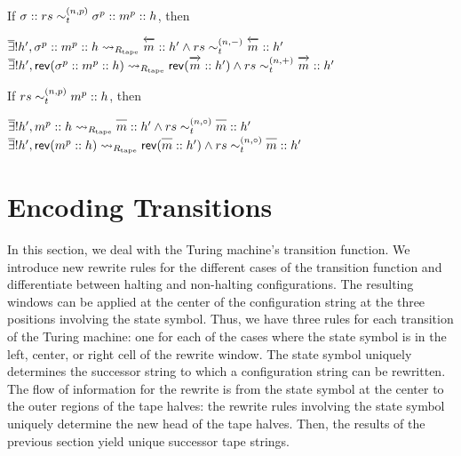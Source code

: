 \begin{lemma}\label{lem:tape_rem}
  If $\sigma :: rs \sim_t^{(n, p)} \sigma^p :: m^p :: h$, then 
  \begin{enumerate}
     $\mexists h', \sigma^p :: m^p :: h \strent{\Rtape} \polneg{m} :: h' \land rs \reprtt{n}{-} \polneg{m} :: h'$
     $\mexists h', \rev{(\sigma^p :: m^p :: h)} \strent{\Rtape} \rev{(\polpos{m} :: h')} \land rs \reprtt{n}{+} \polpos{m} :: h'$
  \end{enumerate}
\end{lemma}

\begin{lemma}\label{lem:tape_stay}
  If $rs \sim_t^{(n, p)} m^p :: h$, then 
  \begin{enumerate}
     $\mexists h', m^p :: h \strent{\Rtape} \polneut{m} :: h' \land rs \reprtt{n}{\circ} \polneut{m} :: h'$
     $\mexists h', \rev{(m^p :: h)} \strent{\Rtape} \rev{(\polneut{m} :: h')} \land rs \reprtt{n}{\circ} \polneut{m} :: h'$
  \end{enumerate}
\end{lemma}

\section{Encoding Transitions}
In this section, we deal with the Turing machine's transition function. We introduce new rewrite rules for the different cases of the transition function and differentiate between halting and non-halting configurations.
The resulting windows can be applied at the center of the configuration string at the three positions involving the state symbol. Thus, we have three rules for each transition of the Turing machine: one for each of the cases where the state symbol is in the left, center, or right cell of the rewrite window.
The state symbol uniquely determines the successor string to which a configuration string can be rewritten. The flow of information for the rewrite is from the state symbol at the center to the outer regions of the tape halves: the rewrite rules involving the state symbol uniquely determine the new head of the tape halves. Then, the results of the previous section yield unique successor tape strings.

